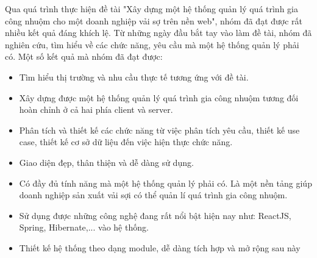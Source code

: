 Qua quá trình thực hiện đề tài "Xây dựng một hệ thống quản lý quá trình gia công nhuộm cho một doanh nghiệp vải sợ trên nền web", nhóm đã đạt được rất nhiều kết quả đáng khích lệ. Từ những ngày đầu bắt tay vào làm đề tài, nhóm đã nghiên cứu, tìm hiểu về các chức năng, yêu cầu mà một hệ thống quản lý phải có. Một số kết quả mà nhóm đã đạt được:

\begin{itemize}
    \item Tìm hiểu thị trường và nhu cầu thực tế tương ứng với đề tài.
    \item Xây dựng được một hệ thống quản lý quá trình gia công nhuộm tương đối hoàn chỉnh ở cả hai phía client và server.
    \item Phân tích và thiết kế các chức năng từ việc phân tích yêu cầu, thiết kế use case, thiết kế cơ sở dữ liệu đến việc hiện thực chức năng.
    \item Giao diện đẹp, thân thiện và dễ dàng sử dụng.
    \item Có đầy đủ tính năng mà một hệ thống  quản lý phải có. Là một nền tảng giúp doanh nghiệp sản xuất vải sợi có thể quản lí quá trình gia công nhuộm.
    \item Sử dụng được những công nghệ đang rất nổi bật hiện nay như: ReactJS, Spring, Hibernate,... vào hệ thống.
    \item Thiết kế hệ thống theo dạng module, dễ dàng tích hợp và mở rộng sau này
\end{itemize}